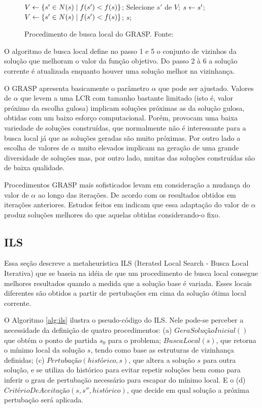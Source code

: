 \begin{figure}[h]
\caption{Procedimento de busca local do GRASP. \mbox{Fonte:
\cite{resende1995}}}\label{alg:grasplocal}
\begin{programma}
\STATE $V \leftarrow \{s{'} \in N(s) \mid f(s{'}) < f(s)\}$;
\STATE Selecione $s{'}$ de $V$;
\STATE $s \leftarrow s{'}$;
\STATE $V \leftarrow \{s{'} \in N(s) \mid f(s{'}) < f(s)\}$;
\ENDWHILE
\STATE\RETURN $s$;
\ENDALGORITHM
\end{programma}
\end{figure}

O algoritmo de busca local define no passo 1 e 5 o conjunto de vizinhos da solução que melhoram o valor da função objetivo. Do passo 2 à 6 a solução corrente é atualizada enquanto houver uma solução melhor na vizinhança. 

O GRASP apresenta basicamente o parâmetro $\alpha$ que pode ser ajustado. Valores de $\alpha$ que levem a uma LCR com tamanho bastante limitado (isto é, valor próximo da escolha gulosa) implicam soluções próximas as da solução gulosa, obtidas com um baixo esforço computacional. Porém, provocam uma baixa variedade de soluções construídas, que normalmente não é interessante para a busca local já que as soluções geradas são muito próximas. Por outro lado a escolha de valores de $\alpha$ muito elevados implicam na geração de uma grande diversidade de soluções mas, por outro lado, muitas das soluções construídas são de baixa qualidade.

Procedimentos GRASP mais sofisticados levam em consideração a mudança do valor de $\alpha$ ao longo das iterações. De acordo com os resultados obtidos em iterações anteriores. Estudos feitos em \cite{prais2000} indicam que essa adaptação do valor de $\alpha$ produz soluções melhores do que aquelas obtidas considerando-o fixo.

\subsection{ILS}

Essa seção descreve a metaheurística ILS (Iterated Local Search - Busca Local Iterativa) que se baseia na idéia de que um procedimento de busca local consegue melhores resultados quando a medida que a solução base é variada. Esses locais diferentes são obtidos a partir de pertubações em cima da solução ótima local corrente.

O Algoritmo \ref{alg:ils} ilustra o pseudo-código do ILS. Nele pode-se perceber a necessidade da definição de quatro procedimentos: (a) $GeraSoluçãoInicial()$ que obtém o ponto de partida $s_{0}$ para o problema; $BuscaLocal(s)$, que retorna o mínimo local da solução $s$, tendo como base as estruturas de vizinhança definidas; (c) $Pertubação(histórico, s)$, que altera a solução $s$ para outra solução, e se utiliza do histórico para evitar repetir soluções bem como para inferir o grau de pertubação necessário para escapar do mínimo local. E o (d) $CritérioDeAceitação(s, s{''}, histórico)$, que decide em qual solução a próxima pertubação será aplicada.

